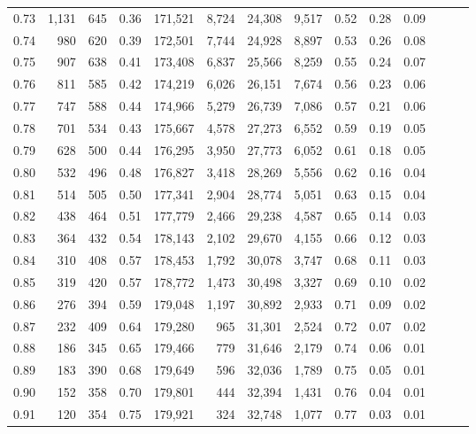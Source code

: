 \begin{tabular}{rrrrrrrrrrrrrr}
0.73 &  1,131 &  645 &  0.36 &  171,521 &    8,724 &  24,308 &   9,517 &  0.52 &  0.28 &      0.09 \\
0.74 &    980 &  620 &  0.39 &  172,501 &    7,744 &  24,928 &   8,897 &  0.53 &  0.26 &      0.08 \\
0.75 &    907 &  638 &  0.41 &  173,408 &    6,837 &  25,566 &   8,259 &  0.55 &  0.24 &      0.07 \\
0.76 &    811 &  585 &  0.42 &  174,219 &    6,026 &  26,151 &   7,674 &  0.56 &  0.23 &      0.06 \\
0.77 &    747 &  588 &  0.44 &  174,966 &    5,279 &  26,739 &   7,086 &  0.57 &  0.21 &      0.06 \\
0.78 &    701 &  534 &  0.43 &  175,667 &    4,578 &  27,273 &   6,552 &  0.59 &  0.19 &      0.05 \\
0.79 &    628 &  500 &  0.44 &  176,295 &    3,950 &  27,773 &   6,052 &  0.61 &  0.18 &      0.05 \\
0.80 &    532 &  496 &  0.48 &  176,827 &    3,418 &  28,269 &   5,556 &  0.62 &  0.16 &      0.04 \\
0.81 &    514 &  505 &  0.50 &  177,341 &    2,904 &  28,774 &   5,051 &  0.63 &  0.15 &      0.04 \\
0.82 &    438 &  464 &  0.51 &  177,779 &    2,466 &  29,238 &   4,587 &  0.65 &  0.14 &      0.03 \\
0.83 &    364 &  432 &  0.54 &  178,143 &    2,102 &  29,670 &   4,155 &  0.66 &  0.12 &      0.03 \\
0.84 &    310 &  408 &  0.57 &  178,453 &    1,792 &  30,078 &   3,747 &  0.68 &  0.11 &      0.03 \\
0.85 &    319 &  420 &  0.57 &  178,772 &    1,473 &  30,498 &   3,327 &  0.69 &  0.10 &      0.02 \\
0.86 &    276 &  394 &  0.59 &  179,048 &    1,197 &  30,892 &   2,933 &  0.71 &  0.09 &      0.02 \\
0.87 &    232 &  409 &  0.64 &  179,280 &      965 &  31,301 &   2,524 &  0.72 &  0.07 &      0.02 \\
0.88 &    186 &  345 &  0.65 &  179,466 &      779 &  31,646 &   2,179 &  0.74 &  0.06 &      0.01 \\
0.89 &    183 &  390 &  0.68 &  179,649 &      596 &  32,036 &   1,789 &  0.75 &  0.05 &      0.01 \\
0.90 &    152 &  358 &  0.70 &  179,801 &      444 &  32,394 &   1,431 &  0.76 &  0.04 &      0.01 \\
0.91 &    120 &  354 &  0.75 &  179,921 &      324 &  32,748 &   1,077 &  0.77 &  0.03 &      0.01 \\

\end{tabular}
